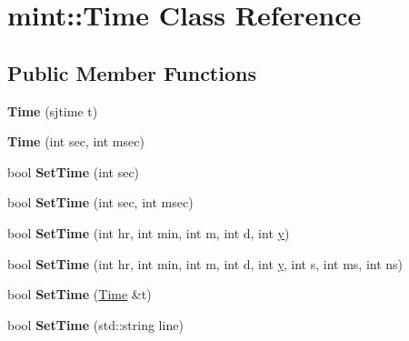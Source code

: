 \hypertarget{classmint_1_1_time}{\section{mint\+:\+:Time Class Reference}
\label{classmint_1_1_time}
}
\subsection*{Public Member Functions}
\begin{DoxyCompactItemize}
\item 
\hypertarget{classmint_1_1_time_a59305fc6113ce4d01e7ed3ee06e2f570}{{\bfseries Time} (sjtime t)}\label{classmint_1_1_time_a59305fc6113ce4d01e7ed3ee06e2f570}

\item 
\hypertarget{classmint_1_1_time_a3581474f602f1aa0f08e127f0bc4fd8d}{{\bfseries Time} (int sec, int msec)}\label{classmint_1_1_time_a3581474f602f1aa0f08e127f0bc4fd8d}

\item 
\hypertarget{classmint_1_1_time_a9a2fdaad466a44d0a33c682083539f61}{bool {\bfseries Set\+Time} (int sec)}\label{classmint_1_1_time_a9a2fdaad466a44d0a33c682083539f61}

\item 
\hypertarget{classmint_1_1_time_ab3689795667e27bbc0c612a3c7f667b6}{bool {\bfseries Set\+Time} (int sec, int msec)}\label{classmint_1_1_time_ab3689795667e27bbc0c612a3c7f667b6}

\item 
\hypertarget{classmint_1_1_time_ae78381b6d5ad3b8912374897a299ee6e}{bool {\bfseries Set\+Time} (int hr, int min, int m, int d, int \hyperlink{_ice_utils_8h_aa7ffaed69623192258fb8679569ff9ba}{y})}\label{classmint_1_1_time_ae78381b6d5ad3b8912374897a299ee6e}

\item 
\hypertarget{classmint_1_1_time_a8d4a859415ee71d8c57c9cac7740a756}{bool {\bfseries Set\+Time} (int hr, int min, int m, int d, int \hyperlink{_ice_utils_8h_aa7ffaed69623192258fb8679569ff9ba}{y}, int s, int ms, int ns)}\label{classmint_1_1_time_a8d4a859415ee71d8c57c9cac7740a756}

\item 
\hypertarget{classmint_1_1_time_a18ea7817bce5744b7fe8ec28c7a916fc}{bool {\bfseries Set\+Time} (\hyperlink{classmint_1_1_time}{Time} \&t)}\label{classmint_1_1_time_a18ea7817bce5744b7fe8ec28c7a916fc}

\item 
\hypertarget{classmint_1_1_time_a180f7f9cb4fcf4aab97c13f55e8f62d7}{bool {\bfseries Set\+Time} (std\+::string line)}\label{classmint_1_1_time_a180f7f9cb4fcf4aab97c13f55e8f62d7}


\end{DoxyCompactItemize}
